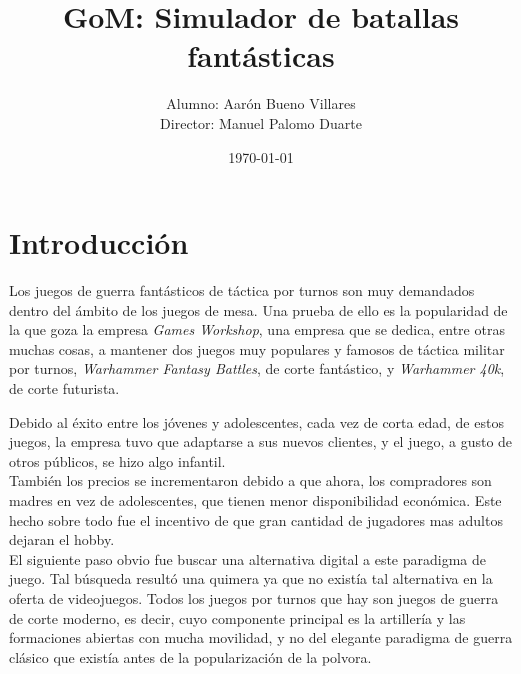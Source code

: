 \documentclass[a4paper,11pt]{article} %
\title{GoM: Simulador de batallas fantásticas} %
\author{Alumno: Aarón Bueno Villares\\Director: Manuel Palomo Duarte} %
\date{\today} %
\begin{document}
\sinmargen
\maketitle %


\tableofcontents %

\section{Introducción}

\noindent Los juegos de guerra fantásticos de táctica por turnos son muy
demandados dentro del ámbito de los juegos de mesa. Una prueba de
ello es la popularidad de la que goza la empresa \emph{Games
  Workshop}, una empresa que se dedica, entre otras muchas cosas, a
mantener dos juegos muy populares y famosos de táctica militar por
turnos, \emph{Warhammer Fantasy Battles}, de corte fantástico, y
\emph{Warhammer 40k}, de corte futurista.

\noindent Debido al éxito entre los jóvenes y adolescentes, cada vez
de corta edad, de estos juegos, la empresa tuvo que adaptarse a sus
nuevos clientes, y el juego, a gusto de otros públicos, se hizo algo infantil.\\

\noindent También los precios se incrementaron debido a que ahora, los
compradores son madres en vez de adolescentes, que tienen menor disponibilidad
económica. Este hecho sobre todo fue el incentivo de que gran cantidad
de jugadores mas adultos dejaran el hobby.\\

\noindent El siguiente paso obvio fue buscar una alternativa digital a
este paradigma de juego. Tal búsqueda resultó una quimera ya que no
existía tal alternativa en la oferta de videojuegos. Todos los juegos
por turnos que hay son juegos de guerra de corte moderno, es decir,
cuyo componente principal es la artillería y las formaciones abiertas
con mucha movilidad, y no del elegante paradigma de guerra clásico que
existía antes de la popularización de la polvora.\\
\end{document}
